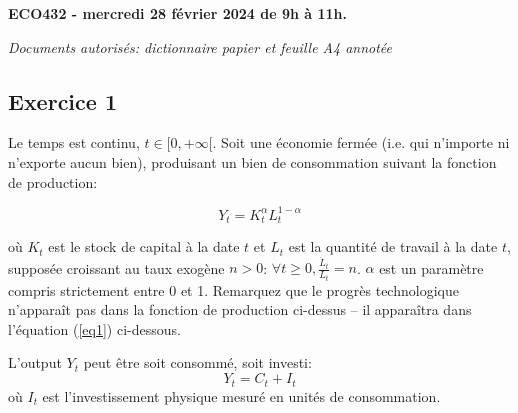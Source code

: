 \documentclass{article}
\author{}
\date{}
\begin{document}
\begin{center}
    \textbf{ECO432 - mercredi 28 février 2024 de 9h à 11h.}


\end{center}

\begin{center}

\textit{Documents autorisés: dictionnaire papier et feuille A4 annotée}

\end{center}
\bigskip
\bigskip


\hypertarget{exercice-1}{%

\subsection{Exercice 1}\label{exercice}}



Le temps est continu, $t \in [0, +\infty[$. Soit une économie fermée (i.e. qui n’importe ni n’exporte aucun bien), produisant un bien de consommation suivant la fonction de production:

\begin{equation}\label{eq0} Y_t = K_t^{\alpha} L_t^{1-\alpha} \end{equation}

où \( K_t \) est le stock de capital à la date \( t \) et \( L_t \) est la quantité de travail à la date \( t \), supposée croissant au taux exogène \( n > 0 \): \( \forall t \geq 0, \frac{\dot{L}_t}{L_t} = n \). \( \alpha \) est un paramètre compris strictement entre 0 et 1.  Remarquez que le progrès technologique n'apparaît pas dans la fonction de production ci-dessus -- il apparaîtra dans l'équation (\ref{eq1}) ci-dessous.

L'output $Y_t$ peut être soit consommé, soit investi:
\begin{equation}Y_t=C_t+I_t \end{equation} où $I_t$ est l'investissement physique mesuré en unités de consommation. 

\end{document}

